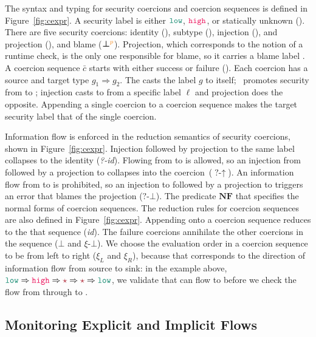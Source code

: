The syntax and typing for security coercions and coercion sequences is defined
in Figure~\ref{fig:cexpr}. A security label is either $\low$, $\high$, or
statically unknown (\unk). There are five security coercions: identity (),
subtype (\up), injection (\inj{\ell}), and projection (), and
blame ($\boldsymbol{\bot}^{\bl{p}}$). Projection, which corresponds to the
notion of a runtime check, is the only one responsible for blame, so it carries
a blame label . A coercion sequence $\bar{c}$ starts with either success
 or failure (). Each coercion has a source and target
type $g_1 \Rightarrow g_2$. The  casts the label $g$ to itself;
\up~promotes security from \low to \high; injection casts to \unk from a
specific label $\ell$ and projection does the opposite. Appending a single
coercion to a coercion sequence makes the target security label that of the
single coercion.

Information flow is enforced in the reduction semantics of security coercions,
shown in Figure~\ref{fig:cexpr}. Injection followed by projection to the same
label collapses to the identity (\textit{?-id}). Flowing from \low to \high is
allowed, so an injection from \low followed by a projection to \high collapses
into the \up{} coercion~($\textit{?-}\uparrow$). An information flow from \high
to \low is prohibited, so an injection to \high followed by a projection to \low
triggers an error that blames the projection ($\textit{?-}\bot$). The predicate
$\mathbf{NF}$ that specifies the normal forms of coercion sequences. The
reduction rules for coercion sequences are also defined in
Figure~\ref{fig:cexpr}. Appending  onto a coercion sequence reduces to the
that sequence (\textit{id}). The failure coercions annihilate the other
coercions in the sequence ($\bot$ and $\xi\textit{-}\bot$). We choose the
evaluation order in a coercion sequence to be from left to right ($\xi_L$ and
$\xi_R$), because that corresponds to the direction of information flow from
source to sink: in the example above, $\low \Rightarrow \high \Rightarrow \unk
\Rightarrow \unk \Rightarrow \low$, we validate that \low can flow to \high
before we check the flow from \high through \unk to \low.

\subsection{Monitoring Explicit and Implicit Flows}
\label{sec:cexpr-comp-stamp}


